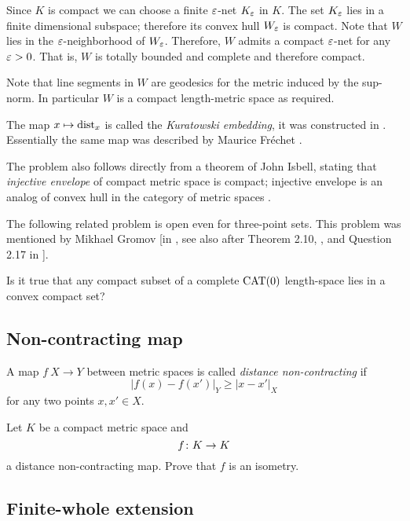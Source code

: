 Since $K$ is compact we can choose a finite $\varepsilon$-net $K_\varepsilon$ in $K$.
The set $K_\varepsilon$ lies in a finite dimensional subspace;
therefore its convex hull $W_\varepsilon$ is compact.
Note that $W$ lies in the $\varepsilon$-neighborhood of $W_\varepsilon$.
Therefore, $W$ admits a compact $\varepsilon$-net for any $\varepsilon>0$.
That is, $W$ is totally bounded and complete and therefore compact.

Note that line segments in $W$ are geodesics for the metric induced by the sup-norm. 
In particular $W$ is a compact length-metric space as required.
\qeds

The map $x\mapsto \operatorname{\rm dist}\nolimits_x$ is called the \emph{Kuratowski embedding},
it was constructed in \cite{kuratowski}.
Essentially the same map 
was described by Maurice Fr\'echet \cite[][this is the paper where metric spaces were introduced]{frechet}.

The problem also follows directly from a theorem of John Isbell, stating that \emph{injective envelope} of compact metric space is compact;
injective envelope is an analog of convex hull in the category of metric spaces
\cite[see 2.11 in][]{isbell}.

The following related problem is open even for three-point sets.
This problem was mentioned by Mikhael Gromov [in ,
see also  after Theorem 2.10, , and Question 2.17 in ].

\begin{pr}
Is it true that any compact subset of a complete $\operatorname{\rm CAT}\nolimits(0)$ length-space lies in a convex compact set?
\end{pr}


\subsection*{Non-contracting map\easy}
\label{Noncontracting map}

A map $f\: X\to Y$ between metric spaces is called \emph{distance non-contracting} if
\[|f(x)-f(x')|_Y\ge |x-x'|_X\]
for any two points $x,x'\in X$.

\begin{pr}
Let $K$  be a compact metric space and
\[f\:K\z\to K\] 
a distance non-contracting map.
Prove that $f$ is an isometry.
\end{pr}

\subsection*{Finite-whole extension}
\label{Finite-whole extension}

